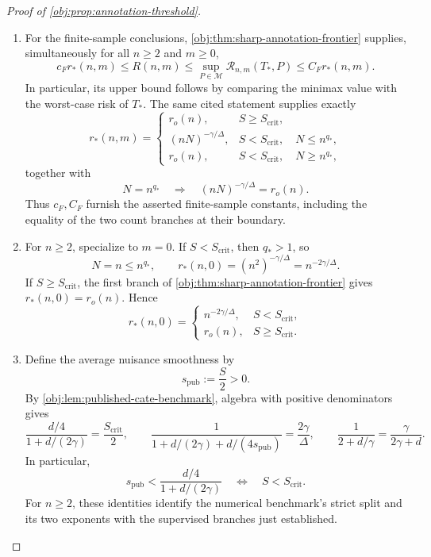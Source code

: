 \begin{proof}[Proof of \cref{obj:prop:annotation-threshold}]
\begin{enumerate}
\item
For the finite-sample conclusions,
\cref{obj:thm:sharp-annotation-frontier} supplies, simultaneously for all \(n\ge2\) and \(m\ge0\),
\[
c_F r_*(n,m)\le R(n,m)
\le\sup_{P\in\mathcal M}\mathcal R_{n,m}(T_*,P)
\le C_F r_*(n,m).
\]
In particular, its upper bound follows by comparing the minimax value with the worst-case risk of \(T_*\). The same cited statement supplies exactly
\[
r_*(n,m)=
\begin{cases}
r_o(n),&S\ge S_{\mathrm{crit}},\\
(nN)^{-\gamma/\Delta},
&S<S_{\mathrm{crit}},\quad N\le n^{q_*},\\
r_o(n),
&S<S_{\mathrm{crit}},\quad N\ge n^{q_*},
\end{cases}
\]
together with
\[
N=n^{q_*}
\quad\Longrightarrow\quad
(nN)^{-\gamma/\Delta}=r_o(n).
\]
Thus \(c_F,C_F\) furnish the asserted finite-sample constants, including the equality of the two count branches at their boundary.

\item
For \(n\ge2\), specialize to \(m=0\). If \(S<S_{\mathrm{crit}}\), then \(q_*>1\), so
\[
N=n\le n^{q_*},
\qquad
r_*(n,0)=(n^2)^{-\gamma/\Delta}
=n^{-2\gamma/\Delta}.
\]
If \(S\ge S_{\mathrm{crit}}\), the first branch of
\cref{obj:thm:sharp-annotation-frontier} gives \(r_*(n,0)=r_o(n)\). Hence
\[
r_*(n,0)=
\begin{cases}
n^{-2\gamma/\Delta},&S<S_{\mathrm{crit}},\\
r_o(n),&S\ge S_{\mathrm{crit}}.
\end{cases}
\]

\item
Define the average nuisance smoothness by
\[
s_{\mathrm{pub}}:=\frac S2>0.
\]
By \cref{obj:lem:published-cate-benchmark}, algebra with positive denominators gives
\[
\frac{d/4}{1+d/(2\gamma)}
=\frac{S_{\mathrm{crit}}}{2},
\qquad
\frac{1}{1+d/(2\gamma)+d/(4s_{\mathrm{pub}})}
=\frac{2\gamma}{\Delta},
\qquad
\frac{1}{2+d/\gamma}
=\frac{\gamma}{2\gamma+d}.
\]
In particular,
\[
s_{\mathrm{pub}}<\frac{d/4}{1+d/(2\gamma)}
\quad\Longleftrightarrow\quad
S<S_{\mathrm{crit}}.
\]
For \(n\ge2\), these identities identify the numerical benchmark's strict split and its two exponents with the supervised branches just established.


\end{enumerate}
\end{proof}
